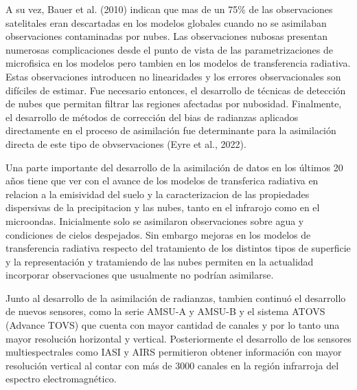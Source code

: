 \documentclass[12pt,oneside]{reedthesis}
\begin{document}
A su vez, Bauer et al. (2010) indican que mas de un 75\% de las observaciones satelitales eran descartadas en los modelos globales cuando no se asimilaban observaciones contaminadas por nubes. Las observaciones nubosas presentan numerosas complicaciones desde el punto de vista de las parametrizaciones de microfisica en los modelos pero tambien en los modelos de transferencia radiativa. Estas observaciones introducen no linearidades y los errores observacionales son difíciles de estimar. Fue necesario entonces, el desarrollo de técnicas de detección de nubes que permitan filtrar las regiones afectadas por nubosidad. Finalmente, el desarrollo de métodos de corrección del bias de radianzas aplicados directamente en el proceso de asimilación fue determinante para la asimilación directa de este tipo de obvservaciones (Eyre et al., 2022).

Una parte importante del desarrollo de la asimilación de datos en los últimos 20 años tiene que ver con el avance de los modelos de transferica radiativa en relacion a la emisividad del suelo y la caracterizacion de las propiedades dispersivas de la precipitacion y las nubes, tanto en el infrarojo como en el microondas. Inicialmente solo se asimilaron observaciones sobre agua y condiciones de cielos despejados. Sin embargo mejoras en los modelos de transferencia radiativa respecto del tratamiento de los distintos tipos de superficie y la representación y tratamiendo de las nubes permiten en la actualidad incorporar observaciones que usualmente no podrían asimilarse.

Junto al desarrollo de la asimilación de radianzas, tambien continuó el desarrollo de nuevos sensores, como la serie AMSU-A y AMSU-B y el sistema ATOVS (Advance TOVS) que cuenta con mayor cantidad de canales y por lo tanto una mayor resolución horizontal y vertical. Posteriormente el desarrollo de los sensores multiespectrales como IASI y AIRS permitieron obtener información con mayor resolución vertical al contar con más de 3000 canales en la región infrarroja del espectro electromagnético.
\end{document}
